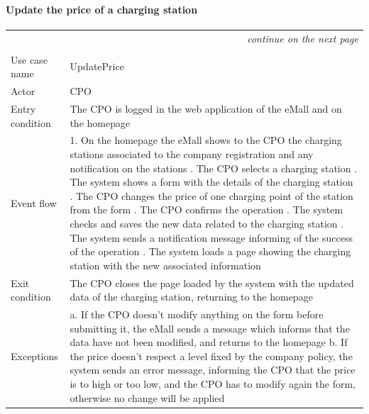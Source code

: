 \paragraph{Update the price of a charging station}
\begin{center}
    \begin{longtable}{p{4cm} p{11cm}}
    \multicolumn{2}{r}{\itshape{continue on the next page}}\\
    \endfoot 
    \\
    \endlastfoot
    \hline
     Use case name &  UpdatePrice\\
     \hline
     Actor & CPO \\
     \hline
     Entry condition & The CPO is logged in the web application of the eMall and on the homepage \\
     \hline
     Event flow &   1. On the homepage the eMall shows to the CPO the charging stations associated to the company                   registration and any notification on the stations \newline
                    2. The CPO selects a charging station \newline 
                    3. The system shows a form with the details of the charging station \newline
                    4. The CPO changes the price of one charging point of the station from the form \newline
                    5. The CPO confirms the operation \newline
                    6. The system checks and saves the new data related to the charging station \newline
                    7. The system sends a notification message informing of the success of the operation \newline
                    8. The system loads a page showing the charging station with the new associated information\\
     \hline
     Exit condition &  The CPO closes the page loaded by the system with the updated data of the charging station, returning to the homepage \\
     \hline
     Exceptions &   a. If the CPO doesn't modify anything on the form before submitting it, the eMall sends a                       message which informs that the data have not been modified, and returns to the homepage \newline
                    b. If the price doesn't respect a level fixed by the company policy, the system sends an error message, informing the CPO that the price is to high or too low, and the CPO has to modify again the form, otherwise no change will be applied \newline

\end{longtable}
\end{center}
